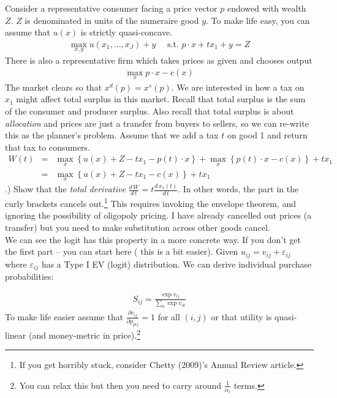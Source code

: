 \documentclass[12pt]{article}
\begin{document}
\noindent Consider a representative consumer facing a price vector $p$ endowed with wealth $Z$. $Z$ is denominated in units of the numeraire good $y$. To make life easy, you can assume that $u(x)$ is strictly quasi-concave.
\begin{eqnarray*}
\max_{x,y} u(x_1,\ldots,x_J) + y \quad \mbox{ s.t. } p \cdot x + t x_1 + y = Z
\end{eqnarray*}
There is also a representative firm which takes prices as given and chooses output
\begin{eqnarray*}
\max_x p \cdot x - c(x)
\end{eqnarray*}
The market clears so that $x^d(p) = x^s(p)$. We are interested in how a tax on $x_1$ might affect total surplus in this market. Recall that total surplus is the sum of the consumer and producer surplus. Also recall that total surplus is about \textit{allocation} and prices are just a transfer from buyers to sellers, so we can re-write this as the planner's problem. Assume that we add a tax $t$ on good 1 and return that tax to consumers.
\begin{eqnarray*}
W(t) &=& \max_x \left\{  u(x) + Z - t x_1 - p(t) \cdot x \right\}  + \max_x \left\{  p(t) \cdot x - c(x)\right\} + t x_1\\
&=& \max_x \left\{  u(x) + Z - t x_1  - c(x)\right\} + t x_1
\end{eqnarray*}
.) Show that the \textit{total derivative} $\frac{d\, W}{d\, t} = t \frac{d\, x_1(t)}{d\, t}$. In other words, the part in the curly brackets cancels out.\footnote{If you get horribly stuck, consider Chetty (2009)'s Annual Review article.} This requires invoking the envelope theorem, and ignoring the possibility of oligopoly pricing. I have already cancelled out prices (a transfer) but you need to make substitution across other goods cancel.\\

We can see the logit has this property in a more concrete way. If you don't get the first part -- you can start here ( this is a bit easier). Given $u_{ij} = v_{ij} + \varepsilon_{ij}$ where $\varepsilon_{ij}$ has a Type I EV (logit) distribution. We can derive individual purchase probabilities:

\begin{eqnarray*}
S_{ij} = \frac{\exp v_{ij}}{\sum_k \exp v_{ik}}
\end{eqnarray*}
To make life easier assume that $\frac{\partial v_{ij}}{\partial p_{pij}}=1$ for all $(i,j)$ or that utility is quasi-linear (and money-metric in price).\footnote{You can relax this but then you need to carry around $\frac{1}{\alpha_i}$ terms.}\\
\end{document}
